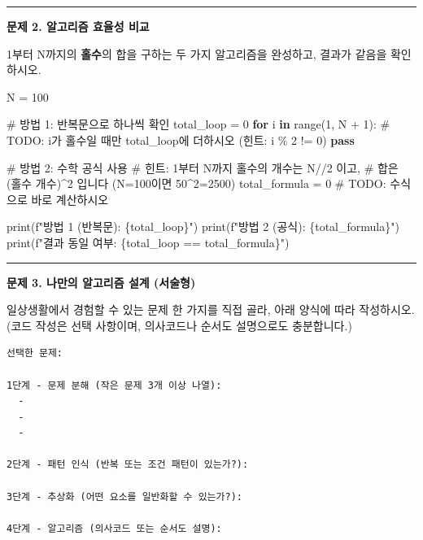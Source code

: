 \documentclass[
  korean,
  11pt,
  a4paper,
  DIV=11,
  numbers=noendperiod]{scrreprt}
\newenvironment{Shaded}{\begin{snugshade}}{\end{snugshade}}
\newcommand{\AlertTok}[1]{\textcolor[rgb]{0.68,0.00,0.00}{#1}}
\newcommand{\BuiltInTok}[1]{\textcolor[rgb]{0.00,0.23,0.31}{#1}}
\newcommand{\CommentTok}[1]{\textcolor[rgb]{0.37,0.37,0.37}{#1}}
\newcommand{\ControlFlowTok}[1]{\textcolor[rgb]{0.00,0.23,0.31}{\textbf{#1}}}
\newcommand{\DecValTok}[1]{\textcolor[rgb]{0.68,0.00,0.00}{#1}}
\newcommand{\KeywordTok}[1]{\textcolor[rgb]{0.00,0.23,0.31}{\textbf{#1}}}
\newcommand{\NormalTok}[1]{\textcolor[rgb]{0.00,0.23,0.31}{#1}}
\newcommand{\OperatorTok}[1]{\textcolor[rgb]{0.37,0.37,0.37}{#1}}
\newcommand{\SpecialCharTok}[1]{\textcolor[rgb]{0.37,0.37,0.37}{#1}}
\newcommand{\SpecialStringTok}[1]{\textcolor[rgb]{0.13,0.47,0.30}{#1}}
\begin{document}
\begin{center}\rule{0.5\linewidth}{0.5pt}\end{center}

\textbf{문제 2. 알고리즘 효율성 비교}

1부터 N까지의 \textbf{홀수}의 합을 구하는 두 가지 알고리즘을 완성하고,
결과가 같음을 확인하시오.

\begin{Shaded}
\begin{Highlighting}[]
\NormalTok{N }\OperatorTok{=} \DecValTok{100}

\CommentTok{\# 방법 1: 반복문으로 하나씩 확인}
\NormalTok{total\_loop }\OperatorTok{=} \DecValTok{0}
\ControlFlowTok{for}\NormalTok{ i }\KeywordTok{in} \BuiltInTok{range}\NormalTok{(}\DecValTok{1}\NormalTok{, N }\OperatorTok{+} \DecValTok{1}\NormalTok{):}
    \CommentTok{\# }\AlertTok{TODO}\CommentTok{: i가 홀수일 때만 total\_loop에 더하시오 (힌트: i \% 2 != 0)}
    \ControlFlowTok{pass}

\CommentTok{\# 방법 2: 수학 공식 사용}
\CommentTok{\# 힌트: 1부터 N까지 홀수의 개수는 N//2 이고,}
\CommentTok{\#       합은 (홀수 개수)\^{}2 입니다 (N=100이면 50\^{}2=2500)}
\NormalTok{total\_formula }\OperatorTok{=} \DecValTok{0}   \CommentTok{\# }\AlertTok{TODO}\CommentTok{: 수식으로 바로 계산하시오}

\BuiltInTok{print}\NormalTok{(}\SpecialStringTok{f"방법 1 (반복문): }\SpecialCharTok{\{}\NormalTok{total\_loop}\SpecialCharTok{\}}\SpecialStringTok{"}\NormalTok{)}
\BuiltInTok{print}\NormalTok{(}\SpecialStringTok{f"방법 2 (공식):   }\SpecialCharTok{\{}\NormalTok{total\_formula}\SpecialCharTok{\}}\SpecialStringTok{"}\NormalTok{)}
\BuiltInTok{print}\NormalTok{(}\SpecialStringTok{f"결과 동일 여부: }\SpecialCharTok{\{}\NormalTok{total\_loop }\OperatorTok{==}\NormalTok{ total\_formula}\SpecialCharTok{\}}\SpecialStringTok{"}\NormalTok{)}
\end{Highlighting}
\end{Shaded}

\begin{center}\rule{0.5\linewidth}{0.5pt}\end{center}

\textbf{문제 3. 나만의 알고리즘 설계 (서술형)}

일상생활에서 경험할 수 있는 문제 한 가지를 직접 골라, 아래 양식에 따라
작성하시오. (코드 작성은 선택 사항이며, 의사코드나 순서도 설명으로도
충분합니다.)

\begin{verbatim}
선택한 문제:

1단계 - 문제 분해 (작은 문제 3개 이상 나열):
  - 
  - 
  - 

2단계 - 패턴 인식 (반복 또는 조건 패턴이 있는가?):

3단계 - 추상화 (어떤 요소를 일반화할 수 있는가?):

4단계 - 알고리즘 (의사코드 또는 순서도 설명):
\end{verbatim}
\end{document}
